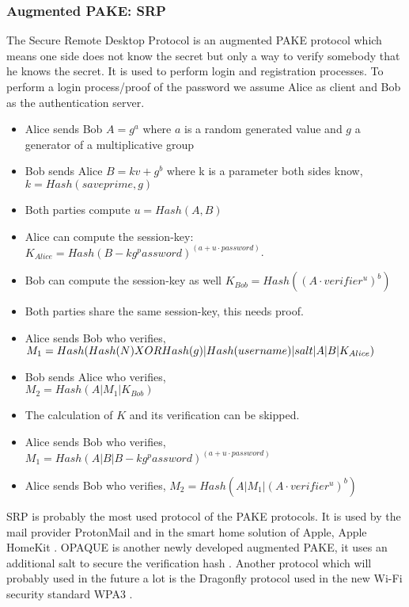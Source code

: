 \documentclass[journal]{IEEEtran}
\begin{document}
\subsubsection{Augmented PAKE: SRP}
    The Secure Remote Desktop Protocol is an augmented PAKE protocol which means one side does not know the secret but only a way to verify somebody that he knows the secret. \cite{wu1998secure}
    It is used to perform login and registration processes.
    To perform a login process/proof of the password we assume Alice as client and Bob as the authentication server.
    \begin{itemize}[]
        \item Alice sends Bob $A = g^a$ where $a$ is a random generated value and $g$ a generator of a multiplicative group
        \item Bob sends Alice $B = kv + g^b$ where k is a parameter both sides know, $k = Hash(save prime, g)$
        \item Both parties compute $u = Hash(A,B)$
        \item Alice can compute the session-key: $K_{Alice} = Hash(B - kg^password)^(a + u \cdot password)$.
        \item Bob can compute the session-key as well $K_{Bob} = Hash((A \cdot verifier^u) ^ b)$
        \item Both parties share the same session-key, this needs proof.
        \item Alice sends Bob who verifies, \\  
        $M_1 = Hash(Hash(N) XOR Hash(g) \\
        | Hash(username) | salt | A | B | K_{Alice})$ 
        \item Bob sends Alice who verifies, \\ 
        $M_2 = Hash(A | M_1 | K_{Bob})$
        \item The calculation of $K$ and its verification can be skipped.
        \item Alice sends Bob who verifies, $M_1 = Hash(A | B | B - kg^password)^(a + u \cdot password)$
        \item Alice sends Bob who verifies, $M_2 = Hash(A | M_1 | (A \cdot verifier^u)^b)$
    \end{itemize}
    SRP is probably the most used protocol of the PAKE protocols.
    It is used by the mail provider ProtonMail and in the smart home solution of Apple, Apple HomeKit \cite{hao2022sok}. 
    OPAQUE is another newly developed augmented PAKE, it uses an additional salt to secure the verification hash \cite{jarecki2018opaque}. 
    Another protocol which will probably used in the future a lot is the Dragonfly protocol used in the new Wi-Fi security standard WPA3 \cite{vanhoef2020dragonblood}. %
    \cite{wu1998secure}
\end{document}
